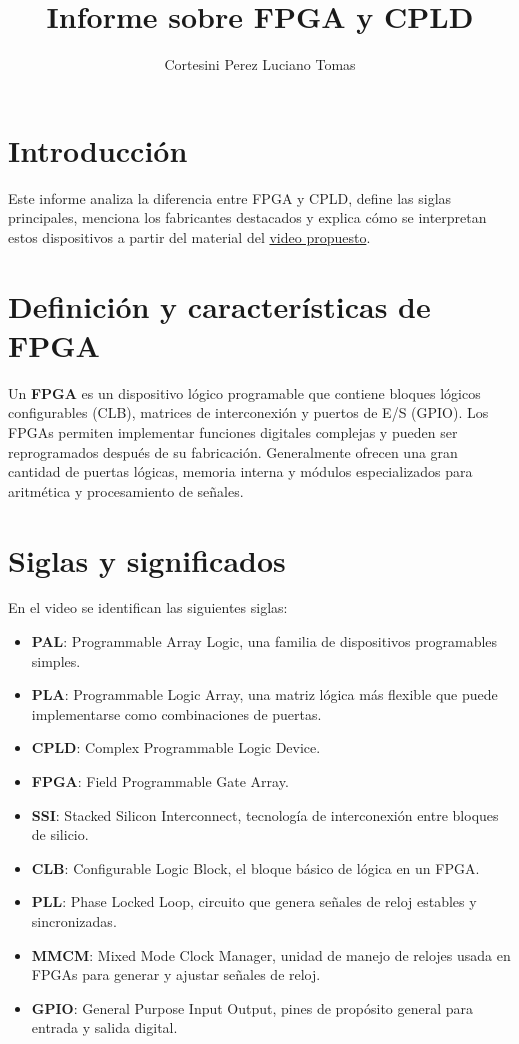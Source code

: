 \documentclass{article}
\title{Informe sobre FPGA y CPLD}
\author{Cortesini Perez Luciano Tomas}
\date{}
\theoremstyle{mytheoremstyle}
\theoremstyle{mytheoremstyle}
\theoremstyle{myproblemstyle}
\begin{document}
\maketitle

\section{Introducción}
Este informe analiza la diferencia entre FPGA y CPLD, define las siglas principales, menciona los
fabricantes destacados y explica cómo se interpretan estos dispositivos a partir del material del
\href{https://www.youtube.com/watch?v=trBiZkW6POk}{video propuesto}.

\section{Definición y características de FPGA}
Un \textbf{FPGA} es un dispositivo lógico programable que contiene bloques lógicos configurables (CLB),
matrices de interconexión y puertos de E/S (GPIO).  
Los FPGAs permiten implementar funciones digitales complejas y pueden ser reprogramados después de
su fabricación. Generalmente ofrecen una gran cantidad de puertas lógicas, memoria interna y módulos
especializados para aritmética y procesamiento de señales.

\section{Siglas y significados}
En el video se identifican las siguientes siglas:
\begin{itemize}
    \item \textbf{PAL}: Programmable Array Logic, una familia de dispositivos programables simples.
    \item \textbf{PLA}: Programmable Logic Array, una matriz lógica más flexible que puede implementarse como combinaciones de puertas.
    \item \textbf{CPLD}: Complex Programmable Logic Device.
    \item \textbf{FPGA}: Field Programmable Gate Array.
    \item \textbf{SSI}: Stacked Silicon Interconnect, tecnología de interconexión entre bloques de silicio.
    \item \textbf{CLB}: Configurable Logic Block, el bloque básico de lógica en un FPGA.
    \item \textbf{PLL}: Phase Locked Loop, circuito que genera señales de reloj estables y sincronizadas.
    \item \textbf{MMCM}: Mixed Mode Clock Manager, unidad de manejo de relojes usada en FPGAs para generar y ajustar señales de reloj.
    \item \textbf{GPIO}: General Purpose Input Output, pines de propósito general para entrada y salida digital.
\end{itemize}
\end{document}
